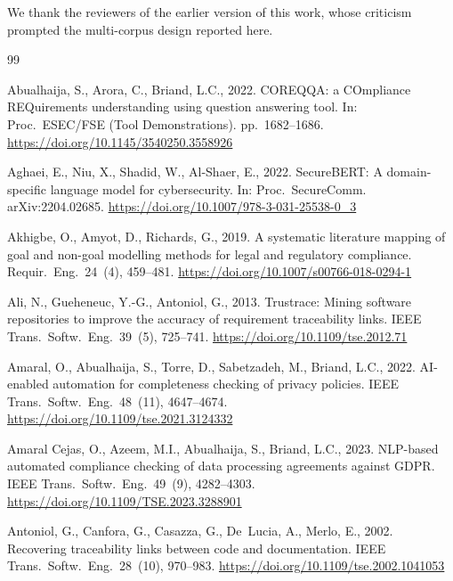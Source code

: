 \documentclass[smallextended,natbib]{svjour3}
\begin{document}
\begin{acknowledgements}
We thank the reviewers of the earlier version of this work, whose criticism
prompted the multi-corpus design reported here.


\end{acknowledgements}
\begin{thebibliography}{99}

Abualhaija, S., Arora, C., Briand, L.C., 2022. COREQQA: a COmpliance REQuirements understanding using question answering tool. In: Proc.\ ESEC/FSE (Tool Demonstrations). pp.\ 1682--1686. \url{https://doi.org/10.1145/3540250.3558926}

Aghaei, E., Niu, X., Shadid, W., Al-Shaer, E., 2022. SecureBERT: A domain-specific language model for cybersecurity. In: Proc.\ SecureComm. arXiv:2204.02685. \url{https://doi.org/10.1007/978-3-031-25538-0_3}

Akhigbe, O., Amyot, D., Richards, G., 2019. A systematic literature mapping of goal and non-goal modelling methods for legal and regulatory compliance. Requir.\ Eng.\ 24~(4), 459--481. \url{https://doi.org/10.1007/s00766-018-0294-1}

Ali, N., Gueheneuc, Y.-G., Antoniol, G., 2013. Trustrace: Mining software repositories to improve the accuracy of requirement traceability links. IEEE Trans.\ Softw.\ Eng.\ 39~(5), 725--741. \url{https://doi.org/10.1109/tse.2012.71}

Amaral, O., Abualhaija, S., Torre, D., Sabetzadeh, M., Briand, L.C., 2022. AI-enabled automation for completeness checking of privacy policies. IEEE Trans.\ Softw.\ Eng.\ 48~(11), 4647--4674. \url{https://doi.org/10.1109/tse.2021.3124332}

Amaral Cejas, O., Azeem, M.I., Abualhaija, S., Briand, L.C., 2023. NLP-based automated compliance checking of data processing agreements against GDPR. IEEE Trans.\ Softw.\ Eng.\ 49~(9), 4282--4303. \url{https://doi.org/10.1109/TSE.2023.3288901}

Antoniol, G., Canfora, G., Casazza, G., De~Lucia, A., Merlo, E., 2002. Recovering traceability links between code and documentation. IEEE Trans.\ Softw.\ Eng.\ 28~(10), 970--983. \url{https://doi.org/10.1109/tse.2002.1041053}


\end{thebibliography}
\end{document}
